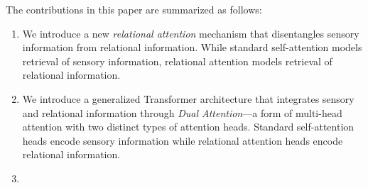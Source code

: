 The contributions in this paper are summarized as follows:
\begin{enumerate}
  \item We introduce a new \textit{relational attention} mechanism that disentangles sensory information from relational information. While standard self-attention models retrieval of sensory information, relational attention models retrieval of relational information.
  \item We introduce a generalized Transformer architecture that integrates sensory and relational information through \textit{Dual Attention}---a form of multi-head attention with two distinct types of attention heads. Standard self-attention heads encode sensory information while relational attention heads encode relational information.
  \item {}
\end{enumerate}


